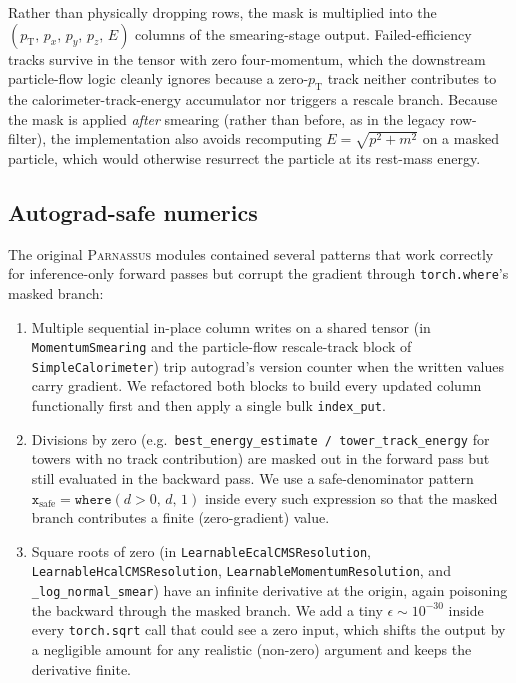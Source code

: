 \documentclass[a4paper,11pt]{article}
\begin{document}
Rather than physically dropping rows, the mask is multiplied into the
$(p_\mathrm{T},\,p_x,\,p_y,\,p_z,\,E)$ columns of the
smearing-stage output. Failed-efficiency tracks survive in the tensor
with zero four-momentum, which the downstream particle-flow logic
cleanly ignores because a zero-$p_\mathrm{T}$ track neither contributes
to the calorimeter-track-energy accumulator nor triggers a rescale
branch. Because the mask is applied \emph{after} smearing (rather than
before, as in the legacy row-filter), the implementation also avoids
recomputing $E=\sqrt{p^2+m^2}$ on a masked particle, which would
otherwise resurrect the particle at its rest-mass energy.

\subsection{Autograd-safe numerics}

The original \textsc{Parnassus} modules contained several patterns
that work correctly for inference-only forward passes but corrupt the
gradient through \texttt{torch.where}'s masked branch:

\begin{enumerate}
 \item Multiple sequential in-place column writes on a shared tensor
       (in \texttt{MomentumSmearing} and the particle-flow
       rescale-track block of \texttt{SimpleCalorimeter}) trip
       autograd's version counter when the written values carry
       gradient. We refactored both blocks to build every updated
       column functionally first and then apply a single bulk
       \texttt{index\_put}.
 \item Divisions by zero (e.g.\ \texttt{best\_energy\_estimate /
       tower\_track\_energy} for towers with no track contribution)
       are masked out in the forward pass but still evaluated in the
       backward pass. We use a safe-denominator pattern
       $\texttt{x}_\mathrm{safe} = \texttt{where}(d>0,\, d,\, 1)$
       inside every such expression so that the masked branch
       contributes a finite (zero-gradient) value.
 \item Square roots of zero (in
       \texttt{LearnableEcalCMSResolution}, \texttt{LearnableHcalCMS\-Resolution},
       \texttt{LearnableMomentumResolution}, and
       \texttt{\_log\_normal\_smear}) have an infinite derivative at
       the origin, again poisoning the backward through the masked
       branch. We add a tiny $\epsilon \sim 10^{-30}$ inside every
       \texttt{torch.sqrt} call that could see a zero input, which
       shifts the output by a negligible amount for any realistic
       (non-zero) argument and keeps the derivative finite.
\end{enumerate}
\end{document}
